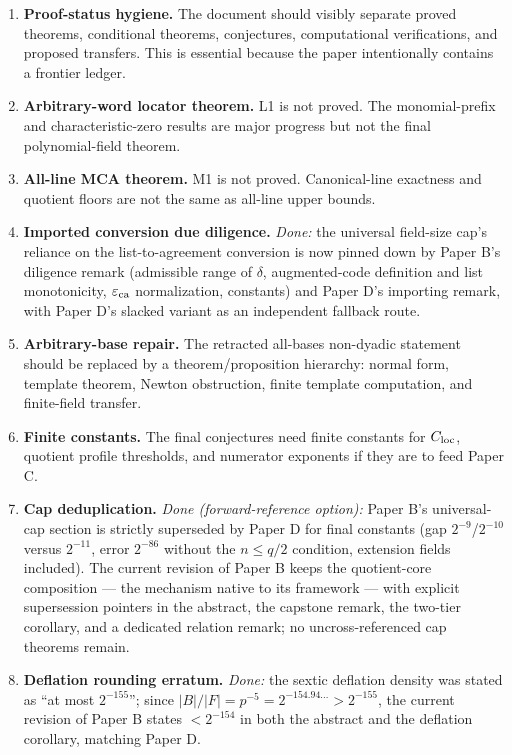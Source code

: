 \documentclass[11pt]{article}
\theoremstyle{definition}
\theoremstyle{remark}
\newcommand{\eca}{\varepsilon_{\rm ca}}
\newcommand{\paperB}{Paper B}
\newcommand{\paperC}{Paper C}
\newcommand{\paperD}{Paper D}
\begin{document}
\begin{enumerate}[label=B\arabic*.,leftmargin=2.2em]
\item \textbf{Proof-status hygiene.}  The document should visibly separate proved theorems, conditional theorems, conjectures, computational verifications, and proposed transfers.  This is essential because the paper intentionally contains a frontier ledger.
\item \textbf{Arbitrary-word locator theorem.}  L1 is not proved.  The monomial-prefix and characteristic-zero results are major progress but not the final polynomial-field theorem.
\item \textbf{All-line MCA theorem.}  M1 is not proved.  Canonical-line exactness and quotient floors are not the same as all-line upper bounds.
\item \textbf{Imported conversion due diligence.}  \emph{Done:} the universal field-size cap's reliance on the list-to-agreement conversion is now pinned down by \paperB's diligence remark (admissible range of $\delta$, augmented-code definition and list monotonicity, $\eca$ normalization, constants) and \paperD's importing remark, with \paperD's slacked variant as an independent fallback route.
\item \textbf{Arbitrary-base repair.}  The retracted all-bases non-dyadic statement should be replaced by a theorem/proposition hierarchy: normal form, template theorem, Newton obstruction, finite template computation, and finite-field transfer.
\item \textbf{Finite constants.}  The final conjectures need finite constants for $C_{\rm loc}$, quotient profile thresholds, and numerator exponents if they are to feed \paperC{}.
\item \textbf{Cap deduplication.}  \emph{Done (forward-reference option):} \paperB's universal-cap section is strictly superseded by \paperD{} for final constants (gap $2^{-9}$/$2^{-10}$ versus $2^{-11}$, error $2^{-86}$ without the $n\le q/2$ condition, extension fields included).  The current revision of \paperB{} keeps the quotient-core composition --- the mechanism native to its framework --- with explicit supersession pointers in the abstract, the capstone remark, the two-tier corollary, and a dedicated relation remark; no uncross-referenced cap theorems remain.
\item \textbf{Deflation rounding erratum.}  \emph{Done:} the sextic deflation density was stated as ``at most $2^{-155}$''; since $|B|/|F|=p^{-5}=2^{-154.94\ldots}>2^{-155}$, the current revision of \paperB{} states $<2^{-154}$ in both the abstract and the deflation corollary, matching \paperD.

\end{enumerate}
\end{document}
